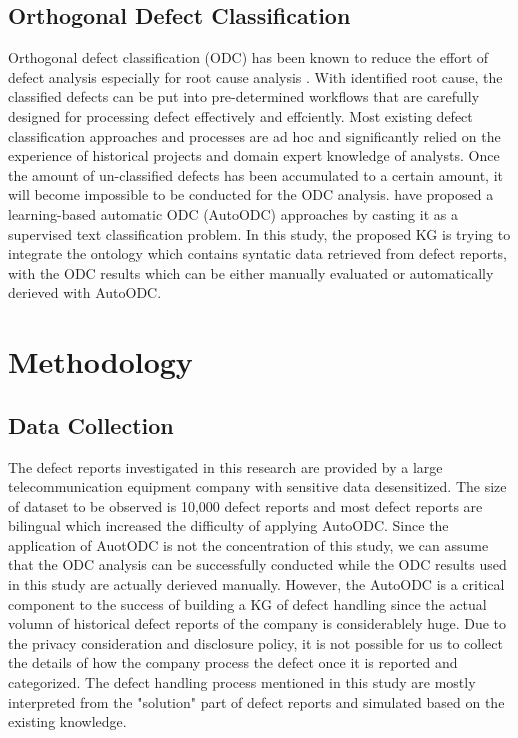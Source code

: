 \documentclass[12pt] {article}
\begin{document}
\subsection{Orthogonal Defect Classification}
Orthogonal defect classification (ODC) has been known to reduce the effort of defect analysis especially for root cause analysis \cite{buglione2006introducing}.
With identified root cause, the classified defects can be put into pre-determined workflows that are carefully designed for processing defect effectively and effciently. 
Most existing defect classification approaches and processes are ad hoc and significantly relied on the experience of historical projects and domain expert knowledge of analysts. 
Once the amount of un-classified defects has been accumulated to a certain amount, it will become impossible to be conducted for the ODC analysis.
 have proposed a learning-based automatic ODC (AutoODC) approaches by casting it as a supervised text classification problem.
In this study, the proposed KG is trying to integrate the ontology which contains syntatic data retrieved from defect reports, with the ODC results which can be either manually evaluated or automatically derieved with AutoODC.  

\section{Methodology}
\subsection{Data Collection}
The defect reports investigated in this research are provided by a large telecommunication equipment company with sensitive data desensitized.
The size of dataset to be observed is 10,000 defect reports and most defect reports are bilingual which increased the difficulty of applying AutoODC.
Since the application of AuotODC is not the concentration of this study, we can assume that the ODC analysis can be successfully conducted while the ODC results used in this study are actually derieved manually.
However, the AutoODC is a critical component to the success of building a KG of defect handling since the actual volumn of historical defect reports of the company is considerablely huge.
Due to the privacy consideration and disclosure policy, it is not possible for us to collect the details of how the company process the defect once it is reported and categorized.
The defect handling process mentioned in this study are mostly interpreted from the "solution" part of defect reports and simulated based on the existing knowledge.
\end{document}
